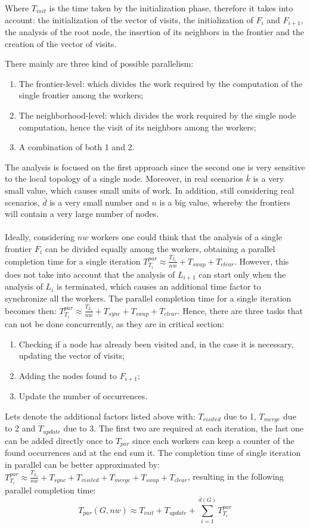 Where $T_{init}$ is the time taken by the
initialization phase, therefore it takes into account: the initialization of the 
vector of visits, the initialization of $F_i$ and $F_{i+1}$, the analysis 
of the root node, the insertion of its neighbors in the frontier and 
the creation of the vector of visits.

There mainly are three kind of possible parallelism:
\begin{enumerate}
    \item The frontier-level: which divides 
    the work required by the computation of the single frontier among the workers;
    \item The neighborhood-level: which divides the work required by the single
    node computation, hence the visit of its neighbors among the workers;
    \item A combination of both 1 and 2.
\end{enumerate}
The analysis is focused on the first approach since the second
one is very sensitive to the local topology of a single node. 
Moreover, 
in real scenarios $\bar{k}$ is a very small value, which causes small units of work. 
In addition, still considering real scenarios, $\bar{d}$ is a very small number
 and $n$ is a big value, 
whereby the frontiers will contain a very large number of nodes.
\\
\\
Ideally, considering $nw$ workers one could think that the analysis of a single
frontier $F_i$ can be divided equally among the workers, obtaining a parallel
completion time for a single iteration $T^{par}_{T_i} \approx \frac{T_{L_i}}{nw} + T_{swap} + T_{clear}$. 
However, this does not take into account that the analysis of
$L_{i+1}$ can start only when the analysis of $L_{i}$ is terminated,
which causes an additional time factor to synchronize all the workers. 
The parallel completion time for a single iteration becomes then:
$T^{par}_{T_i} \approx \frac{T_{L_i}}{nw} + T_{sync} + T_{swap} + T_{clear}$.
Hence, 
there are three tasks that can not be done concurrently, 
as they are in critical section:
\begin{enumerate}
    \item Checking if a node has already been visited and, in the case it is 
    necessary, updating the vector of visits;
    \item Adding the nodes found to $F_{i+1}$;
    \item Update the number of occurrences.
\end{enumerate}
Lets denote the additional factors listed above with:
 $T_{visited}$ due to 1, $T_{merge}$ due to 2 and $T_{update}$ due to 3.
 The first two are required at each iteration, the last one can be 
 added directly once to $T_{par}$ since each workers
 can keep a counter of the found occurrences and at the end sum it.
 The completion time of single iteration in parallel can be better 
 approximated by: $T^{par}_{T_i} \approx \frac{T_{L_i}}{nw} 
 + T_{sync}
  + T_{visited} + T_{merge} + T_{swap} + T_{clear}$, resulting in the following 
  parallel completion time: 
  $$
  T_{par}(G, nw) \approx T_{init} + T_{update} + \sum^{\bar{d}(G)}_{i=1} T^{par}_{T_i}
  $$



